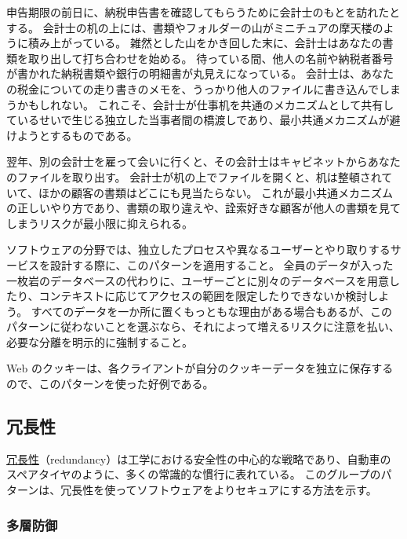 \documentclass[uplatex]{jsarticle}
\def\label#1{}%
\begin{document}
\begin{exa}[会計士の机]\label{exa:ch4-accountant}
申告期限の前日に、納税申告書を確認してもらうために会計士のもとを訪れたとする。
会計士の机の上には、書類やフォルダーの山がミニチュアの摩天楼のように積み上がっている。
雑然とした山をかき回した末に、会計士はあなたの書類を取り出して打ち合わせを始める。
待っている間、他人の名前や納税者番号が書かれた納税書類や銀行の明細書が丸見えになっている。
会計士は、あなたの税金についての走り書きのメモを、うっかり他人のファイルに書き込んでしまうかもしれない。
これこそ、会計士が仕事机を共通のメカニズムとして共有しているせいで生じる独立した当事者間の橋渡しであり、最小共通メカニズムが避けようとするものである。

翌年、別の会計士を雇って会いに行くと、その会計士はキャビネットからあなたのファイルを取り出す。
会計士が机の上でファイルを開くと、机は整頓されていて、ほかの顧客の書類はどこにも見当たらない。
これが最小共通メカニズムの正しいやり方であり、書類の取り違えや、詮索好きな顧客が他人の書類を見てしまうリスクが最小限に抑えられる。
\end{exa}

ソフトウェアの分野では、独立したプロセスや異なるユーザーとやり取りするサービスを設計する際に、このパターンを適用すること。
全員のデータが入った一枚岩のデータベースの代わりに、ユーザーごとに別々のデータベースを用意したり、コンテキストに応じてアクセスの範囲を限定したりできないか検討しよう。
すべてのデータを一か所に置くもっともな理由がある場合もあるが、このパターンに従わないことを選ぶなら、それによって増えるリスクに注意を払い、必要な分離を明示的に強制すること。

\begin{exa}\label{exa:ch4-cookies-least-common}
Web のクッキーは、各クライアントが自分のクッキーデータを独立に保存するので、このパターンを使った好例である。
\end{exa}

\subsection{冗長性}

\underline{冗長性}（redundancy）は工学における安全性の中心的な戦略であり、自動車のスペアタイヤのように、多くの常識的な慣行に表れている。
このグループのパターンは、冗長性を使ってソフトウェアをよりセキュアにする方法を示す。

\subsubsection{多層防御}
\end{document}
